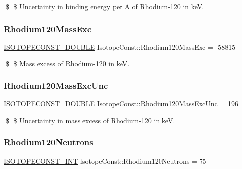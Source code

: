 \$ \$ Uncertainty in binding energy per A of Rhodium-\/120 in keV. \mbox{\label{group___isotope_const-_rhodium-_rh120_ga03137528f848cdad468aaf11ee21f8f3}} 
\subsubsection{\texorpdfstring{Rhodium120\+Mass\+Exc}{Rhodium120MassExc}}
{\footnotesize\ttfamily \mbox{\hyperlink{group___isotope_const-_macros_ga8f45a7272ce02c0b4c65c44636ed719a}{I\+S\+O\+T\+O\+P\+E\+C\+O\+N\+S\+T\+\_\+\+D\+O\+U\+B\+LE}} Isotope\+Const\+::\+Rhodium120\+Mass\+Exc = -\/58815}

\$ \$ Mass excess of Rhodium-\/120 in keV. \mbox{\label{group___isotope_const-_rhodium-_rh120_ga74fe5109ee40ba93116dc1b4b3b69925}} 
\subsubsection{\texorpdfstring{Rhodium120\+Mass\+Exc\+Unc}{Rhodium120MassExcUnc}}
{\footnotesize\ttfamily \mbox{\hyperlink{group___isotope_const-_macros_ga8f45a7272ce02c0b4c65c44636ed719a}{I\+S\+O\+T\+O\+P\+E\+C\+O\+N\+S\+T\+\_\+\+D\+O\+U\+B\+LE}} Isotope\+Const\+::\+Rhodium120\+Mass\+Exc\+Unc = 196}

\$ \$ Uncertainty in mass excess of Rhodium-\/120 in keV. \mbox{\label{group___isotope_const-_rhodium-_rh120_gaa931c9922b9efd69e71a940b9eb3238e}} 
\subsubsection{\texorpdfstring{Rhodium120\+Neutrons}{Rhodium120Neutrons}}
{\footnotesize\ttfamily \mbox{\hyperlink{group___isotope_const-_macros_ga5f18360b3e99483a35c32d789e62621c}{I\+S\+O\+T\+O\+P\+E\+C\+O\+N\+S\+T\+\_\+\+I\+NT}} Isotope\+Const\+::\+Rhodium120\+Neutrons = 75}

